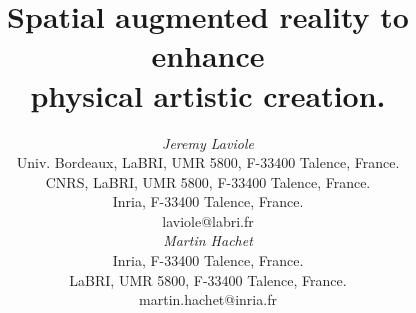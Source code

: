 \documentclass{article}
\begin{document}




\title{Spatial augmented reality to enhance \\
       physical artistic creation.}


\author{
\parbox[t]{9cm}{\centering
	     {\em Jeremy Laviole}\\
	     Univ. Bordeaux, LaBRI, UMR 5800, F-33400 Talence, France.\\
         CNRS, LaBRI, UMR 5800, F-33400 Talence, France.\\
	     Inria, F-33400  Talence, France.\\
	     laviole@labri.fr }
\parbox[t]{9cm}{\centering
	     {\em Martin Hachet}\\
	     Inria, F-33400 Talence, France.\\
	     LaBRI, UMR 5800, F-33400 Talence, France.\\
	     martin.hachet@inria.fr}
}
\end{document}
